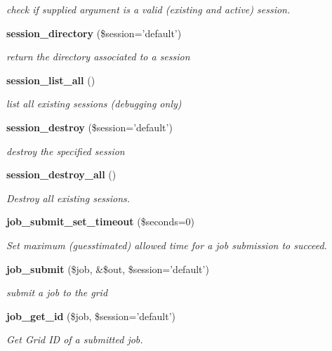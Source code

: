 \begin{CompactItemize}
\begin{CompactList}\small\item\em check if supplied argument is a valid (existing and active) session. \item\end{CompactList}\item 
{\bf session\_\-directory} (\$session='default')
\begin{CompactList}\small\item\em return the directory associated to a session \item\end{CompactList}\item 
{\bf session\_\-list\_\-all} ()
\begin{CompactList}\small\item\em list all existing sessions (debugging only) \item\end{CompactList}\item 
{\bf session\_\-destroy} (\$session='default')
\begin{CompactList}\small\item\em destroy the specified session \item\end{CompactList}\item 
{\bf session\_\-destroy\_\-all} ()
\begin{CompactList}\small\item\em Destroy all existing sessions. \item\end{CompactList}\item 
{\bf job\_\-submit\_\-set\_\-timeout} (\$seconds=0)
\begin{CompactList}\small\item\em Set maximum (guesstimated) allowed time for a job submission to succeed. \item\end{CompactList}\item 
{\bf job\_\-submit} (\$job, \&\$out, \$session='default')
\begin{CompactList}\small\item\em submit a job to the grid \item\end{CompactList}\item 
{\bf job\_\-get\_\-id} (\$job, \$session='default')
\begin{CompactList}\small\item\em Get Grid ID of a submitted job. \item\end{CompactList}\item 

\end{CompactItemize}

